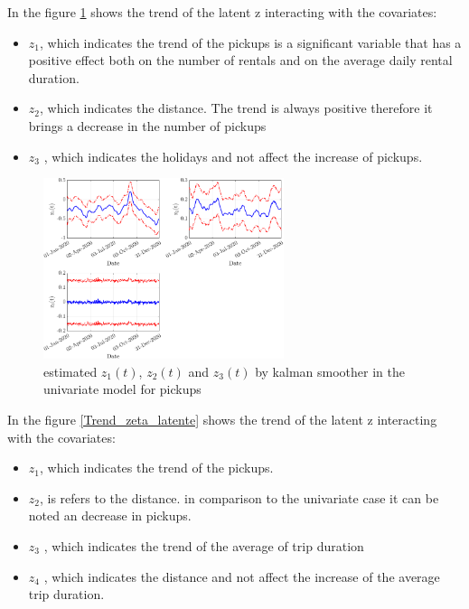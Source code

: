 In the figure \ref{Trend_zeta_latente univariato} shows the trend of the latent z interacting with the covariates:
\begin{itemize}
	\item $z_{1}$, which indicates the trend of the pickups is a significant variable that has a positive effect both on the number of rentals and on the average daily rental duration.
	\item $z_{2}$, which indicates the distance. The trend is always positive therefore it brings a decrease in the number of pickups
	\item $z_{3}$ , which indicates the holidays and not affect the increase of pickups.
\end{itemize}
\begin{figure}
	\centering
	\includegraphics[height=200px]{Images/Data analysis/DCM/Trend_z_pickups.pdf}
	\caption[Estimated of latent z]{estimated $z_{1}(t)$,  $z_{2}(t)$ and $z_{3}(t)$ by kalman smoother in the univariate model for pickups}
	\label{Trend_zeta_latente univariato}
	
\end{figure}
In the figure \ref{Trend_zeta_latente} shows the trend of the latent z interacting with the covariates:
\begin{itemize}
	\item $z_{1}$, which indicates the trend of the pickups.
	\item $z_{2}$, is refers to the distance. in comparison to the univariate case it can be noted  an decrease in pickups.
	\item $z_{3}$ , which indicates the trend of the average of trip duration
	\item $z_{4}$ , which indicates the distance and not affect the increase of the average trip duration.
\end{itemize}
